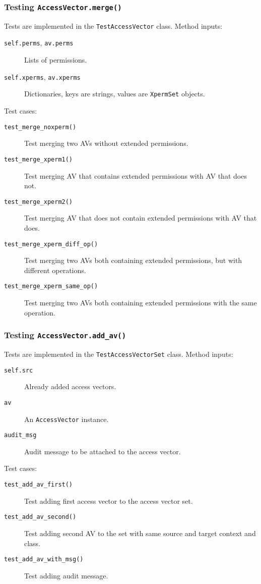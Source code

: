 \subsubsection{Testing \texttt{AccessVector.merge()}}
Tests are implemented in the \texttt{TestAccessVector} class. Method inputs:
\begin{description}
    \item [\texttt{self.perms}, \texttt{av.perms}] Lists of permissions.
    \item [\texttt{self.xperms}, \texttt{av.xperms}] Dictionaries, keys are
        strings, values are \texttt{XpermSet} objects.
\end{description}

Test cases:
\begin{description}
    \item [\texttt{test\_merge\_noxperm()}] Test merging two AVs without
        extended permissions.
    \item [\texttt{test\_merge\_xperm1()}] Test merging AV that contains
        extended permissions with AV that does not.
    \item [\texttt{test\_merge\_xperm2()}] Test merging AV that does not contain
        extended permissions with AV that does.
    \item [\texttt{test\_merge\_xperm\_diff\_op()}] Test merging two AVs both
        containing extended permissions, but with different operations.
    \item [\texttt{test\_merge\_xperm\_same\_op()}] Test merging two AVs both
        containing extended permissions with the same operation.
\end{description}

\subsubsection{Testing \texttt{AccessVector.add\_av()}}
Tests are implemented in the \texttt{TestAccessVectorSet} class. Method inputs:
\begin{description}
    \item [\texttt{self.src}] Already added access vectors.
    \item [\texttt{av}] An \texttt{AccessVector} instance.
    \item [\texttt{audit\_msg}] Audit message to be attached to the access
        vector.
\end{description}

Test cases:
\begin{description}
    \item [\texttt{test\_add\_av\_first()}] Test adding first access vector to
        the access vector set.
    \item [\texttt{test\_add\_av\_second()}] Test adding second AV to the set
        with same source and target context and class.
    \item [\texttt{test\_add\_av\_with\_msg()}] Test adding audit message.
\end{description}

